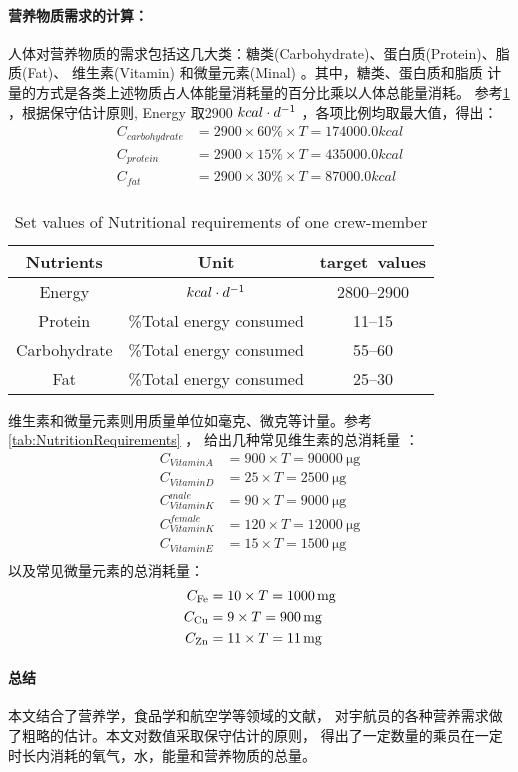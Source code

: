 \documentclass[a4paper]{standalone}
\begin{document}
\paragraph{营养物质需求的计算：}
人体对营养物质的需求包括这几大类：糖类(Carbohydrate)、蛋白质(Protein)、脂质(Fat)、
维生素(Vitamin) 和微量元素(Minal) 。其中，糖类、蛋白质和脂质
计量的方式是各类上述物质占人体能量消耗量的百分比乘以人体总能量消耗。
参考\cref{tab:Nutritional} ，根据保守估计原则,
Energy 取2900 $kcal\cdot d^{-1}$ ，各项比例均取最大值，得出：
\begin{align*}
  C_{carbohydrate} &= 2900 \times 60\% \times T = 174000.0 kcal \\
  C_{protein} &= 2900 \times 15\% \times T = 435000.0 kcal \\
  C_{fat} &= 2900 \times 30\% \times T = 87000.0 kcal \\
\end{align*}

\begin{table}[H]
  \centering
  \caption{Set values of Nutritional requirements of one crew-member}
  \label{tab:Nutritional}
  \begin{tabular}{ccc}
    \toprule
    \textbf{Nutrients} & \textbf{Unit} & \textbf{target~values} \\
    \midrule
    Energy & $kcal\cdot d^{-1}$ & 2800--2900 \\
    Protein & \%Total energy consumed & 11--15 \\
    Carbohydrate & \%Total energy consumed & 55--60 \\
    Fat & \%Total energy consumed & 25--30 \\
    \bottomrule
  \end{tabular}
\end{table}

维生素和微量元素则用质量单位如毫克、微克等计量。参考\cref{tab:NutritionRequirements} ，
给出几种常见维生素的总消耗量 \cite{cooper2011developing}：
\begin{align*}
  C_{Vitamin A} &= 900 \times T = \SI{90000}{\ug} \\
  C_{Vitamin D} &= 25 \times T = \SI{2500}{\ug} \\
  C_{Vitamin K}^{male} &= 90 \times T = \SI{9000}{\ug} \\
  C_{Vitamin K}^{female} &= 120 \times T = \SI{12000}{\ug} \\
  C_{Vitamin E} &= 15 \times T = \SI{1500}{\ug} \\
\end{align*}
以及常见微量元素的总消耗量：
\begin{align*}
  C_{\ce{Fe}} &= 10 \times T = \SI{1000}{\mg} \\
  C_{\ce{Cu}} &= 9 \times T = \SI{900}{\mg} \\
  C_{\ce{Zn}} &= 11 \times T = \SI{11}{\mg}
\end{align*}


\paragraph{总结}
\label{apx:nutrition:end}
本文结合了营养学，食品学和航空学等领域的文献，
对宇航员的各种营养需求做了粗略的估计。本文对数值采取保守估计的原则，
得出了一定数量的乘员在一定时长内消耗的氧气，水，能量和营养物质的总量。
\end{document}
